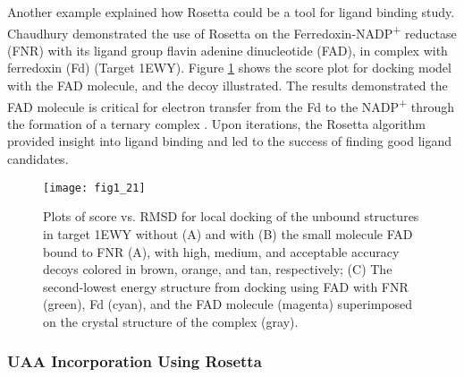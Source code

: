 \begin{refsection}
Another example explained how Rosetta could be a tool for ligand binding study.
Chaudhury  demonstrated the use of Rosetta on the
Ferredoxin-NADP\textsuperscript{+} reductase (FNR) with its ligand group flavin
adenine dinucleotide (FAD), in complex with ferredoxin (Fd) (Target
1EWY)\cite{Chaudhury2011}. Figure \ref{fig:macro-ligand} shows the score plot
for docking model with the FAD molecule, and the decoy illustrated. The results
demonstrated the FAD molecule is critical for electron transfer from the Fd to
the NADP\textsuperscript{+} through the formation of a ternary complex
\cite{Hermoso2002}.  Upon iterations, the Rosetta algorithm provided insight
into ligand binding and led to the success of finding good ligand candidates. 
\begin{figure}[p] \centering \texttt{[image: fig1\_21]}
    \caption[Plots of score vs. RMSD for local docking of the unbound
        structures in target 1EWY without (A) and with (B) the small molecule
        FAD bound to FNR (A), with high, medium, and acceptable accuracy decoys
        colored in brown, orange, and tan, respectively; (C) The second-lowest
        energy structure from docking using FAD with FNR (green), Fd (cyan),
        and the FAD molecule (magenta) superimposed on the crystal structure of
    the complex (gray)] {Plots of score vs. RMSD for local docking of the
        unbound structures in target 1EWY without (A) and with (B) the small
        molecule FAD bound to FNR (A), with high, medium, and acceptable
        accuracy decoys colored in brown, orange, and tan, respectively; (C)
        The second-lowest energy structure from docking using FAD with FNR
        (green), Fd (cyan), and the FAD molecule (magenta) superimposed on the
        crystal structure of the complex (gray)\cite{Chaudhury2011}.} 
        \label{fig:macro-ligand} 
\end{figure}

\subsubsection{UAA Incorporation Using Rosetta}


\end{refsection}
